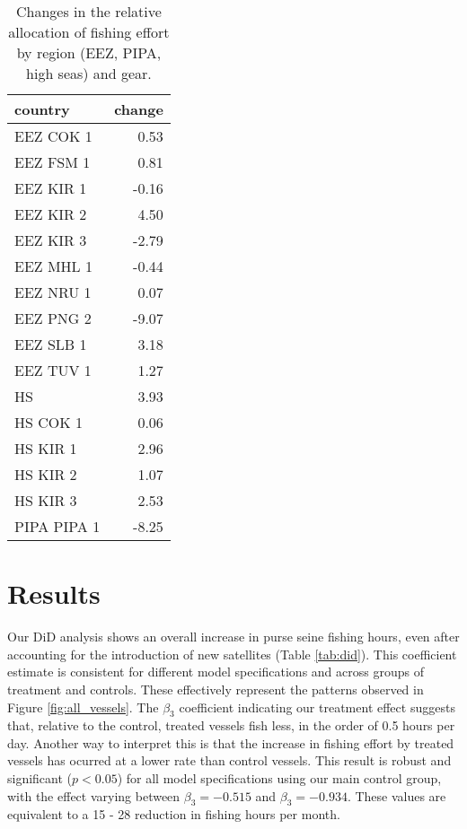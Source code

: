 \documentclass[11pt,]{article}
\begin{document}
\begin{table}[H]

\caption{\label{tab:unnamed-chunk-9}\label{tab:ba_disp}Changes in the relative allocation of fishing effort by region (EEZ, PIPA, high seas) and gear.}
\centering
\begin{tabular}[t]{lr}
\toprule
country & change\\
\midrule
EEZ COK 1 & 0.53\\
EEZ FSM 1 & 0.81\\
EEZ KIR 1 & -0.16\\
EEZ KIR 2 & 4.50\\
EEZ KIR 3 & -2.79\\
\addlinespace
EEZ MHL 1 & -0.44\\
EEZ NRU 1 & 0.07\\
EEZ PNG 2 & -9.07\\
EEZ SLB 1 & 3.18\\
EEZ TUV 1 & 1.27\\
\addlinespace
HS & 3.93\\
HS COK 1 & 0.06\\
HS KIR 1 & 2.96\\
HS KIR 2 & 1.07\\
HS KIR 3 & 2.53\\
PIPA PIPA 1 & -8.25\\
\bottomrule
\end{tabular}
\end{table}

\clearpage

\hypertarget{results}{%
\section{Results}\label{results}}

Our DiD analysis shows an overall increase in purse seine fishing hours,
even after accounting for the introduction of new satellites (Table
\ref{tab:did}). This coefficient estimate is consistent for different
model specifications and across groups of treatment and controls. These
effectively represent the patterns observed in Figure
\ref{fig:all_vessels}. The \(\beta_3\) coefficient indicating our
treatment effect suggests that, relative to the control, treated vessels
fish less, in the order of 0.5 hours per day. Another way to interpret
this is that the increase in fishing effort by treated vessels has
ocurred at a lower rate than control vessels. This result is robust and
significant (\(p < 0.05\)) for all model specifications using our main
control group, with the effect varying between \(\beta_3 = -0.515\) and
\(\beta_3 = -0.934\). These values are equivalent to a 15 - 28 reduction
in fishing hours per month.
\end{document}
